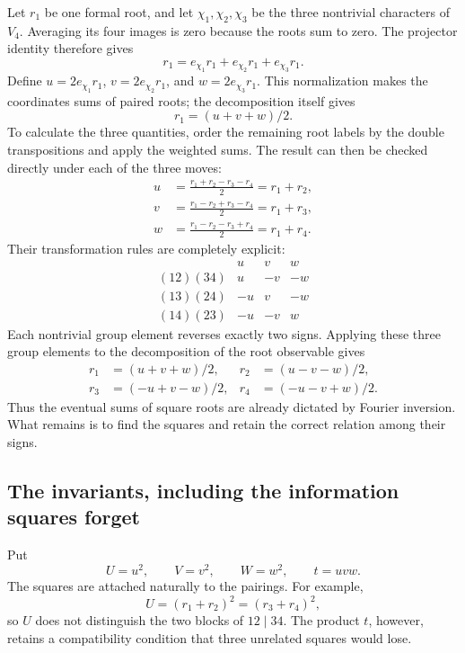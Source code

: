 \documentclass[11pt]{article}
\theoremstyle{remark}
\begin{document}
Let \(r_1\) be one formal root, and let \(\chi_1,\chi_2,\chi_3\) be the three nontrivial characters of \(V_4\). Averaging its four images is zero because the roots sum to zero. The projector identity therefore gives
\[
r_1=e_{\chi_1}r_1+e_{\chi_2}r_1+e_{\chi_3}r_1.
\]
Define \(u=2e_{\chi_1}r_1\), \(v=2e_{\chi_2}r_1\), and \(w=2e_{\chi_3}r_1\). This normalization makes the coordinates sums of paired roots; the decomposition itself gives
\[
r_1=(u+v+w)/2.
\]
To calculate the three quantities, order the remaining root labels by the double transpositions and apply the weighted sums. The result can then be checked directly under each of the three moves:
\begin{align}
u&=\frac{r_1+r_2-r_3-r_4}{2}=r_1+r_2,\nonumber\\
v&=\frac{r_1-r_2+r_3-r_4}{2}=r_1+r_3,\label{eq:quartic-fourier}\\
w&=\frac{r_1-r_2-r_3+r_4}{2}=r_1+r_4.\nonumber
\end{align}
Their transformation rules are completely explicit:
\[
\begin{array}{c|ccc}
 &u&v&w\\ \hline
(12)(34)&u&-v&-w\\
(13)(24)&-u&v&-w\\
(14)(23)&-u&-v&w
\end{array}
\]
Each nontrivial group element reverses exactly two signs. Applying these three group elements to the decomposition of the root observable gives
\begin{equation}
\begin{aligned}
r_1&=(u+v+w)/2,&r_2&=(u-v-w)/2,\\
r_3&=(-u+v-w)/2,&r_4&=(-u-v+w)/2.
\end{aligned}
\label{eq:quartic-inversion}
\end{equation}
Thus the eventual sums of square roots are already dictated by Fourier inversion. What remains is to find the squares and retain the correct relation among their signs.

\subsection{The invariants, including the information squares forget}

Put
\[
U=u^2,\qquad V=v^2,\qquad W=w^2,\qquad t=uvw.
\]
The squares are attached naturally to the pairings. For example,
\[
U=(r_1+r_2)^2=(r_3+r_4)^2,
\]
so \(U\) does not distinguish the two blocks of \(12\mid34\). The product \(t\), however, retains a compatibility condition that three unrelated squares would lose.
\end{document}
